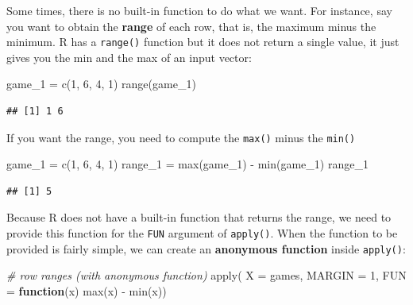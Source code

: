 \documentclass[
]{book}
\newenvironment{Shaded}{\begin{snugshade}}{\end{snugshade}}
\newcommand{\AttributeTok}[1]{\textcolor[rgb]{0.77,0.63,0.00}{#1}}
\newcommand{\CommentTok}[1]{\textcolor[rgb]{0.56,0.35,0.01}{\textit{#1}}}
\newcommand{\ControlFlowTok}[1]{\textcolor[rgb]{0.13,0.29,0.53}{\textbf{#1}}}
\newcommand{\DecValTok}[1]{\textcolor[rgb]{0.00,0.00,0.81}{#1}}
\newcommand{\FunctionTok}[1]{\textcolor[rgb]{0.00,0.00,0.00}{#1}}
\newcommand{\NormalTok}[1]{#1}
\newcommand{\OtherTok}[1]{\textcolor[rgb]{0.56,0.35,0.01}{#1}}
\newcommand{\SpecialCharTok}[1]{\textcolor[rgb]{0.00,0.00,0.00}{#1}}
\begin{document}
Some times, there is no built-in function to do what we want. For instance,
say you want to obtain the \textbf{range} of each row, that is, the maximum minus
the minimum. R has a \texttt{range()} function but it does not return a single value,
it just gives you the min and the max of an input vector:

\begin{Shaded}
\begin{Highlighting}[]
\NormalTok{game\_1 }\OtherTok{=} \FunctionTok{c}\NormalTok{(}\DecValTok{1}\NormalTok{, }\DecValTok{6}\NormalTok{, }\DecValTok{4}\NormalTok{, }\DecValTok{1}\NormalTok{)}
\FunctionTok{range}\NormalTok{(game\_1)}
\end{Highlighting}
\end{Shaded}

\begin{verbatim}
## [1] 1 6
\end{verbatim}

If you want the range, you need to compute the \texttt{max()} minus the \texttt{min()}

\begin{Shaded}
\begin{Highlighting}[]
\NormalTok{game\_1 }\OtherTok{=} \FunctionTok{c}\NormalTok{(}\DecValTok{1}\NormalTok{, }\DecValTok{6}\NormalTok{, }\DecValTok{4}\NormalTok{, }\DecValTok{1}\NormalTok{)}
\NormalTok{range\_1 }\OtherTok{=} \FunctionTok{max}\NormalTok{(game\_1) }\SpecialCharTok{{-}} \FunctionTok{min}\NormalTok{(game\_1)}
\NormalTok{range\_1}
\end{Highlighting}
\end{Shaded}

\begin{verbatim}
## [1] 5
\end{verbatim}

Because R does not have a built-in function that returns the range, we need
to provide this function for the \texttt{FUN} argument of \texttt{apply()}. When the function
to be provided is fairly simple, we can create an \textbf{anonymous function}
inside \texttt{apply()}:

\begin{Shaded}
\begin{Highlighting}[]
\CommentTok{\# row ranges (with anonymous function)}
\FunctionTok{apply}\NormalTok{(}
  \AttributeTok{X =}\NormalTok{ games, }
  \AttributeTok{MARGIN =} \DecValTok{1}\NormalTok{, }
  \AttributeTok{FUN =} \ControlFlowTok{function}\NormalTok{(x) }\FunctionTok{max}\NormalTok{(x) }\SpecialCharTok{{-}} \FunctionTok{min}\NormalTok{(x))}
\end{Highlighting}
\end{Shaded}
\end{document}
